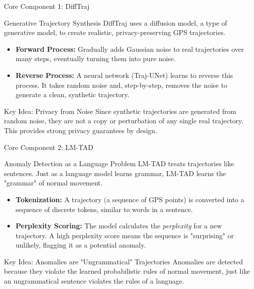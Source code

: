 \documentclass[aspectratio=169,xcolor={dvipsnames}]{beamer}
\begin{document}
\begin{frame}{Core Component 1: DiffTraj}
    \begin{block}{Generative Trajectory Synthesis \cite{zhuDiffTrajGeneratingGPS2023}}
        \small
        DiffTraj uses a diffusion model, a type of generative model, to create realistic, privacy-preserving GPS trajectories.
        \vspace{1em}
        \begin{itemize}
            \item \textbf{Forward Process:} Gradually adds Gaussian noise to real trajectories over many steps, eventually turning them into pure noise.
            \item \textbf{Reverse Process:} A neural network (Traj-UNet) learns to reverse this process. It takes random noise and, step-by-step, removes the noise to generate a clean, synthetic trajectory.
        \end{itemize}
    \end{block}
    
    \vspace{0.5em}
    \begin{alertblock}{Key Idea: Privacy from Noise}
        \centering
        \small
        Since synthetic trajectories are generated from random noise, they are not a copy or perturbation of any single real trajectory. This provides strong privacy guarantees by design.
    \end{alertblock}
\end{frame}

\begin{frame}{Core Component 2: LM-TAD}
    \begin{block}{Anomaly Detection as a Language Problem \cite{mbuyaTrajectoryAnomalyDetection2024}}
        \small
        LM-TAD treats trajectories like sentences. Just as a language model learns grammar, LM-TAD learns the "grammar" of normal movement.
        \vspace{1em}
        \begin{itemize}
            \item \textbf{Tokenization:} A trajectory (a sequence of GPS points) is converted into a sequence of discrete tokens, similar to words in a sentence.
            \item \textbf{Perplexity Scoring:} The model calculates the \textit{perplexity} for a new trajectory. A high perplexity score means the sequence is "surprising" or unlikely, flagging it as a potential anomaly.
        \end{itemize}
    \end{block}

    \vspace{0.5em}
    \begin{alertblock}{Key Idea: Anomalies are "Ungrammatical" Trajectories}
        \centering
        \small
        Anomalies are detected because they violate the learned probabilistic rules of normal movement, just like an ungrammatical sentence violates the rules of a language.
    \end{alertblock}
\end{frame}
\end{document}
